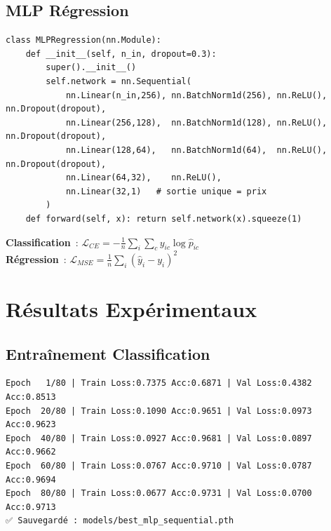 \documentclass[12pt,a4paper]{report}
\begin{document}
\subsection{MLP Régression}
\begin{lstlisting}[caption=MLPRegression --- sortie scalaire pour le prix]
class MLPRegression(nn.Module):
    def __init__(self, n_in, dropout=0.3):
        super().__init__()
        self.network = nn.Sequential(
            nn.Linear(n_in,256), nn.BatchNorm1d(256), nn.ReLU(), nn.Dropout(dropout),
            nn.Linear(256,128),  nn.BatchNorm1d(128), nn.ReLU(), nn.Dropout(dropout),
            nn.Linear(128,64),   nn.BatchNorm1d(64),  nn.ReLU(), nn.Dropout(dropout),
            nn.Linear(64,32),    nn.ReLU(),
            nn.Linear(32,1)   # sortie unique = prix
        )
    def forward(self, x): return self.network(x).squeeze(1)
\end{lstlisting}

\begin{formulebox}
\textbf{Classification}~: $\mathcal{L}_{CE}=-\frac{1}{n}\sum_{i}\sum_{c}y_{ic}\log\hat{p}_{ic}$\\[4pt]
\textbf{Régression}~: $\mathcal{L}_{MSE}=\frac{1}{n}\sum_{i}(\hat{y}_i-y_i)^2$
\end{formulebox}

\section{Résultats Expérimentaux}

\subsection{Entraînement Classification}
\begin{outputbox}
\begin{verbatim}
Epoch   1/80 | Train Loss:0.7375 Acc:0.6871 | Val Loss:0.4382 Acc:0.8513
Epoch  20/80 | Train Loss:0.1090 Acc:0.9651 | Val Loss:0.0973 Acc:0.9623
Epoch  40/80 | Train Loss:0.0927 Acc:0.9681 | Val Loss:0.0897 Acc:0.9662
Epoch  60/80 | Train Loss:0.0767 Acc:0.9710 | Val Loss:0.0787 Acc:0.9694
Epoch  80/80 | Train Loss:0.0677 Acc:0.9731 | Val Loss:0.0700 Acc:0.9713
✅ Sauvegardé : models/best_mlp_sequential.pth
\end{verbatim}
\end{outputbox}
\end{document}
